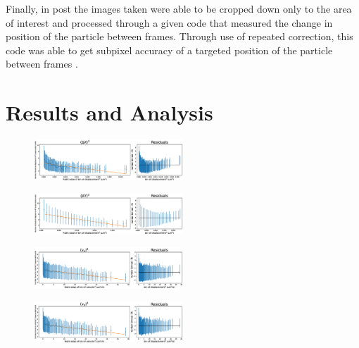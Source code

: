 \documentclass[12pt]{article}
\begin{document}
Finally, in post the images taken were able to be cropped down only to the area of interest and processed through a given code that measured the change in position of the particle between frames. Through use of repeated correction, this code was able to get subpixel accuracy of a targeted position of the particle between frames \cite{code paper}. 



\section{Results and Analysis}
\begin{figure}
\centering
    \includegraphics[width=0.5\textwidth]{delta_x.eps}
	\caption{\cite{handout}}
    \label{fig:opt_trap}
\end{figure} %
\begin{figure}
\centering
    \includegraphics[width=0.5\textwidth]{delta_y.eps}
	\caption{\cite{handout}}
    \label{fig:opt_trap}
\end{figure} %
\begin{figure}
\centering
    \includegraphics[width=0.5\textwidth]{v_x.eps}
	\caption{\cite{handout}}
    \label{fig:opt_trap}
\end{figure} %
\begin{figure}
\centering
    \includegraphics[width=0.5\textwidth]{v_y.eps}
	\caption{\cite{handout}}
    \label{fig:opt_trap}
\end{figure} %
\end{document}
